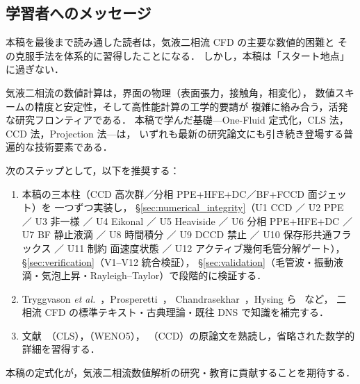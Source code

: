 \subsection{学習者へのメッセージ}
\label{sec:message}

本稿を最後まで読み通した読者は，気液二相流 CFD の主要な数値的困難と
その克服手法を体系的に習得したことになる．
しかし，本稿は「スタート地点」に過ぎない．

気液二相流の数値計算は，界面の物理（表面張力，接触角，相変化），
数値スキームの精度と安定性，そして高性能計算の工学的要請が
複雑に絡み合う，活発な研究フロンティアである．
本稿で学んだ基礎—One-Fluid 定式化，CLS 法，CCD 法，Projection 法—は，
いずれも最新の研究論文にも引き続き登場する普遍的な技術要素である．

次のステップとして，以下を推奨する：
\begin{enumerate}
  \item 本稿の三本柱（CCD 高次群／分相 PPE+HFE+DC／BF+FCCD 面ジェット）を
        一つずつ実装し，
        §\ref{sec:numerical_integrity}（U1 CCD ／ U2 PPE ／ U3 非一様 ／
        U4 Eikonal ／ U5 Heaviside ／ U6 分相 PPE+HFE+DC ／ U7 BF 静止液滴 ／
        U8 時間積分 ／ U9 DCCD 禁止 ／ U10 保存形共通フラックス ／
        U11 制約 面速度状態 ／ U12 アクティブ幾何毛管分解ゲート），
        §\ref{sec:verification}（V1--V12 統合検証），
        §\ref{sec:validation}（毛管波・振動液滴・気泡上昇・Rayleigh--Taylor）で段階的に検証する．
  \item Tryggvason \textit{et al.}~\cite{Tryggvason2011}，Prosperetti~\cite{Prosperetti1981}，
        Chandrasekhar~\cite{Chandrasekhar1961}，Hysing ら~\cite{Hysing2009} など，
        二相流 CFD の標準テキスト・古典理論・既往 DNS で知識を補完する．
  \item 文献~\cite{OlssonKreiss2005}（CLS），\cite{JiangShu1996}（WENO5），
        \cite{ChuFan1998}（CCD）の原論文を熟読し，省略された数学的詳細を習得する．
\end{enumerate}

本稿の定式化が，気液二相流数値解析の研究・教育に貢献することを期待する．
